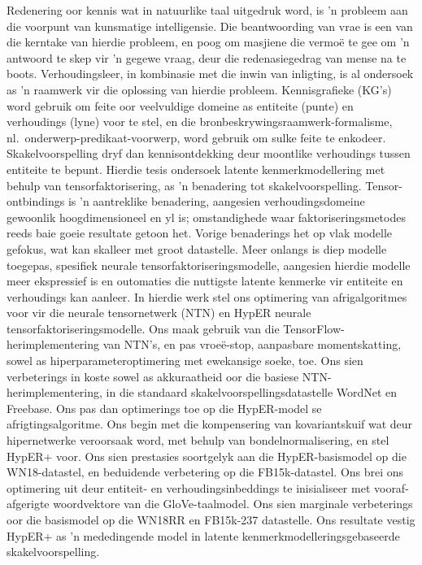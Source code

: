 \begin{opsomming}
Redenering oor kennis wat in natuurlike taal uitgedruk word, is 'n
probleem aan die voorpunt van kunsmatige intelligensie. Die
beantwoording van vrae is een van die kerntake van hierdie probleem,
en poog om masjiene die vermo\"e te gee om 'n antwoord te skep vir
'n gegewe vraag, deur die redenasiegedrag van mense na te boots.
Verhoudingsleer, in kombinasie met die inwin van inligting, is al
ondersoek as 'n raamwerk vir die oplossing van hierdie probleem.
Kennisgrafieke (KG's) word gebruik om feite oor veelvuldige domeine
as entiteite (punte) en verhoudings (lyne) voor te stel, en die
bronbeskrywingsraamwerk-formalisme, nl.\ onderwerp-predikaat-voorwerp,
word gebruik om sulke feite te enkodeer. Skakelvoorspelling dryf dan
kennisontdekking deur moontlike verhoudings tussen entiteite te bepunt. \newline
\noindent Hierdie tesis ondersoek latente kenmerkmodellering met behulp van
tensorfaktorisering, as 'n benadering tot skakelvoorspelling. Tensor-ontbindings
is 'n aantreklike benadering, aangesien verhoudingsdomeine gewoonlik
hoogdimensioneel en yl is; omstandighede waar faktoriseringsmetodes reeds
baie goeie resultate getoon het. Vorige benaderings het op vlak modelle
gefokus, wat kan skalleer met groot datastelle. Meer onlangs is diep modelle
toegepas, spesifiek neurale tensorfaktoriseringsmodelle, aangesien hierdie
modelle meer ekspressief is en outomaties die nuttigste latente kenmerke vir
entiteite en verhoudings kan aanleer. In hierdie werk stel ons optimering van
afrigalgoritmes voor vir die neurale tensornetwerk (NTN) en HypER neurale tensorfaktoriseringsmodelle. \newline
\noindent Ons maak gebruik van die TensorFlow-herimplementering van NTN's, en pas
vroe\"e-stop, aanpasbare momentskatting, sowel as hiperparameteroptimering
met ewekansige soeke, toe. Ons sien verbeterings in koste sowel as akkuraatheid
oor die basiese NTN-herimplementering, in die standaard
skakelvoorspellingsdatastelle WordNet en Freebase. Ons pas dan optimerings
toe op die HypER-model se afrigtingsalgoritme. Ons begin met die kompensering
van kovariantskuif wat deur hipernetwerke veroorsaak word, met behulp van bondelnormalisering, en stel HypER+ voor. Ons sien prestasies soortgelyk aan die
HypER-basismodel op die WN18-datastel, en beduidende verbetering op die
FB15k-datastel. Ons brei ons optimering uit deur entiteit- en verhoudingsinbeddings
te inisialiseer met vooraf-afgerigte woordvektore van die GloVe-taalmodel. Ons sien
marginale verbeterings oor die basismodel op die WN18RR en FB15k-237
datastelle. Ons resultate vestig HypER+ as 'n mededingende model in latente kenmerkmodelleringsgebaseerde skakelvoorspelling.
\end{opsomming}
 